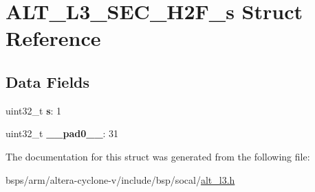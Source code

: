 \hypertarget{structALT__L3__SEC__H2F__s}{}\section{A\+L\+T\+\_\+\+L3\+\_\+\+S\+E\+C\+\_\+\+H2\+F\+\_\+s Struct Reference}
\label{structALT__L3__SEC__H2F__s}
\subsection*{Data Fields}
\begin{DoxyCompactItemize}
\item 
\mbox{\label{structALT__L3__SEC__H2F__s_a0347aa01494e38b56660afaf0f4dc0ce}} 
uint32\+\_\+t {\bfseries s}\+: 1
\item 
\mbox{\label{structALT__L3__SEC__H2F__s_a29dc0911cd86c1b1b9248e5d88b93823}} 
uint32\+\_\+t {\bfseries \+\_\+\+\_\+pad0\+\_\+\+\_\+}\+: 31
\end{DoxyCompactItemize}


The documentation for this struct was generated from the following file\+:\begin{DoxyCompactItemize}
\item 
bsps/arm/altera-\/cyclone-\/v/include/bsp/socal/\mbox{\hyperlink{alt__l3_8h}{alt\+\_\+l3.\+h}}\end{DoxyCompactItemize}

